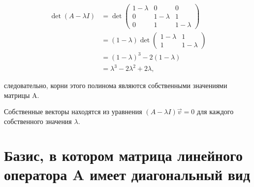 \documentclass[12pt]{article}
\begin{document}
\begin{align*}
\det(A - \lambda I) &= \det\begin{pmatrix} 1-\lambda & 0 & 0 \\ 0 & 1-\lambda & 1 \\ 0 & 1 & 1-\lambda \end{pmatrix} \\
&= (1-\lambda) \det\begin{pmatrix} 1-\lambda & 1 \\ 1 & 1-\lambda \end{pmatrix} \\
&= (1-\lambda)^3 - 2(1-\lambda) \\
&= \lambda^3 - 2\lambda^2 + 2\lambda,
\end{align*}

следовательно, корни этого полинома являются собственными значениями матрицы A.

Собственные векторы находятся из уравнения $(A - \lambda I)\vec{v} = 0$ для каждого собственного значения $\lambda$.

\newpage
\section{Базис, в котором матрица линейного оператора A имеет диагональный вид}
\end{document}

